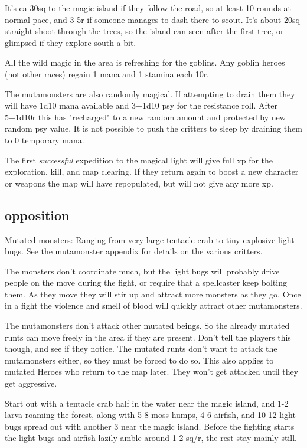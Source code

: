 It's ca 30sq to the magic island if they follow the road, so at least 10 rounds at normal pace, and 3-5r if someone manages to dash there to scout. It's about 20sq straight shoot through the trees, so the island can seen after the first tree, or glimpsed if they explore south a bit.

All the wild magic in the area is refreshing for the goblins. Any goblin heroes (not other races) regain 1 mana and 1 stamina each 10r.

The mutamonsters are also randomly magical. If attempting to drain them they will have 1d10 mana available and 3+1d10 psy for the resistance roll. After 5+1d10r this has "recharged" to a new random amount and protected by new random psy value. It is not possible to push the critters to sleep by draining them to 0 temporary mana.

The first \emph{successful} expedition to the magical light will give full xp for the exploration, kill, and map clearing. If they return again to boost a new character or weapons the map will have repopulated, but will not give any more xp.


\subsection*{opposition}

Mutated monsters: Ranging from very large tentacle crab to tiny explosive light bugs. See the mutamonster appendix for details on the various critters. %

The monsters don't coordinate much, but the light bugs will probably drive people on the move during the fight, or require that a spellcaster keep bolting them. As they move they will stir up and attract more monsters as they go. Once in a fight the violence and smell of blood will quickly attract other mutamonsters.

The mutamonsters don't attack other mutated beings. So the already mutated runts can move freely in the area if they are present. Don't tell the players this though, and see if they notice. The mutated runts don't want to attack the mutamonsters either, so they must be forced to do so. This also applies to mutated Heroes who return to the map later. They won't get attacked until they get aggressive.

Start out with a tentacle crab half in the water near the magic island, and 1-2 larva roaming the forest, along with 5-8 moss humps, 4-6 airfish, and 10-12 light bugs spread out with another 3 near the magic island.
Before the fighting starts the light bugs and airfish lazily amble around 1-2 sq/r, the rest stay mainly still.

